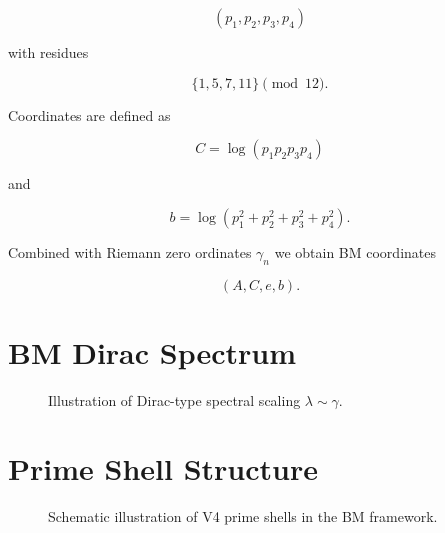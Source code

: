 \documentclass[11pt,a4paper]{article}
\begin{document}
	\[
	(p_1,p_2,p_3,p_4)
	\]
	
	with residues
	
	\[
	\{1,5,7,11\} \pmod{12}.
	\]
	
	Coordinates are defined as
	
	\[
	C = \log(p_1p_2p_3p_4)
	\]
	
	and
	
	\[
	b = \log(p_1^2+p_2^2+p_3^2+p_4^2).
	\]
	
	Combined with Riemann zero ordinates $\gamma_n$
	we obtain BM coordinates
	
	\[
	(A,C,e,b).
	\]
	
	\section{BM Dirac Spectrum}
	
	\begin{figure}[h]
		\centering
		
		\caption{Illustration of Dirac-type spectral scaling
			$\lambda\sim\gamma$.}
		
	\end{figure}
	
	\section{Prime Shell Structure}
	
	\begin{figure}[h]
		\centering
		
		
		\caption{Schematic illustration of V4 prime shells
			in the BM framework.}
		
	\end{figure}
	
\end{document}
